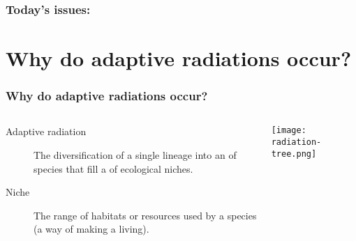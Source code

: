 \begin{noheadline}
\begin{frame}
\frametitle{Today's issues:}
\vspace{5mm}
\tableofcontents[subsectionstyle=hide]
\end{frame}
\end{noheadline}

\section[Why do adaptive radiations occur?]{Why do adaptive radiations occur?}

\begin{noheadline}
\begin{frame}
    \frametitle{Why do adaptive radiations occur?}
    \begin{adjustwidth}{-2em}{-1.5em}
        \begin{columns}

            \begin{description}
                \item[Adaptive radiation]
                    The  diversification of a single lineage
                    into an  of species that fill a
                     of ecological niches.

                \vspace{5mm}
                \item[Niche]
                    The range of habitats or resources used by a species (a way
                    of making a living).
            \end{description}

            
            \begin{center}
                \texttt{[image: radiation-tree.png]}
            \end{center}

        \end{columns}
    \end{adjustwidth}
\end{frame}
\end{noheadline}

{
\begin{frame}[t,plain]
    \begin{adjustwidth}{-2em}{-1.5em}
    \end{adjustwidth}
\end{frame}
}

